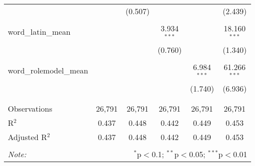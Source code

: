 \begin{table}[!htbp]
\begin{tabular}{@{\extracolsep{-2pt}}lccccc}
  &  & (0.507) &  &  & (2.439) \\ 
  & & & & & \\ 
 word\_latin\_mean &  &  & 3.934$^{***}$ &  & 18.160$^{***}$ \\ 
  &  &  & (0.760) &  & (1.340) \\ 
  & & & & & \\ 
 word\_rolemodel\_mean &  &  &  & 6.984$^{***}$ & 61.266$^{***}$ \\ 
  &  &  &  & (1.740) & (6.936) \\ 
  & & & & & \\ 
\hline \\[-1.8ex] 
Observations & 26,791 & 26,791 & 26,791 & 26,791 & 26,791 \\ 
R$^{2}$ & 0.437 & 0.448 & 0.442 & 0.449 & 0.453 \\ 
Adjusted R$^{2}$ & 0.437 & 0.448 & 0.442 & 0.449 & 0.453 \\ 
\hline 
\hline \\[-1.8ex] 
\textit{Note:}  & \multicolumn{5}{r}{$^{*}$p$<$0.1; $^{**}$p$<$0.05; $^{***}$p$<$0.01} \\ 
\end{tabular} 
\end{table} 
